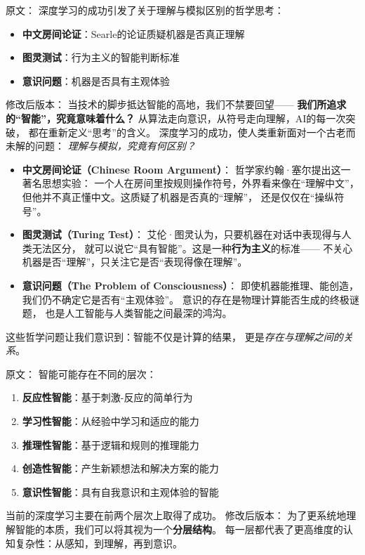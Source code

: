 原文：
深度学习的成功引发了关于理解与模拟区别的哲学思考：
\begin{itemize}
\item \textbf{中文房间论证}：Searle的论证质疑机器是否真正理解
\item \textbf{图灵测试}：行为主义的智能判断标准
\item \textbf{意识问题}：机器是否具有主观体验
\end{itemize}
修改后版本：
当技术的脚步抵达智能的高地，我们不禁要回望——  
\textbf{我们所追求的“智能”，究竟意味着什么？}  
从算法走向意识，从符号走向理解，AI的每一次突破，  
都在重新定义“思考”的含义。  
深度学习的成功，使人类重新面对一个古老而未解的问题：  
\textit{理解与模拟，究竟有何区别？}

\begin{itemize}
\item \textbf{中文房间论证（Chinese Room Argument）}：  
  哲学家约翰·塞尔提出这一著名思想实验：  
  一个人在房间里按规则操作符号，外界看来像在“理解中文”，  
  但他并不真正懂中文。这质疑了机器是否真的“理解”，  
  还是仅仅在“操纵符号”。  

\item \textbf{图灵测试（Turing Test）}：  
  艾伦·图灵认为，只要机器在对话中表现得与人类无法区分，  
  就可以说它“具有智能”。这是一种\textbf{行为主义}的标准——  
  不关心机器是否“理解”，只关注它是否“表现得像在理解”。  

\item \textbf{意识问题（The Problem of Consciousness）}：  
  即使机器能推理、能创造，我们仍不确定它是否有“主观体验”。  
  意识的存在是物理计算能否生成的终极谜题，  
  也是人工智能与人类智能之间最深的鸿沟。  
\end{itemize}
这些哲学问题让我们意识到：智能不仅是计算的结果，  
更是\textit{存在与理解之间的关系}。



原文：
智能可能存在不同的层次：
\begin{enumerate}
\item \textbf{反应性智能}：基于刺激-反应的简单行为
\item \textbf{学习性智能}：从经验中学习和适应的能力
\item \textbf{推理性智能}：基于逻辑和规则的推理能力
\item \textbf{创造性智能}：产生新颖想法和解决方案的能力
\item \textbf{意识性智能}：具有自我意识和主观体验的智能
\end{enumerate}
当前的深度学习主要在前两个层次上取得了成功。
修改后版本：
为了更系统地理解智能的本质，我们可以将其视为一个\textbf{分层结构}。  
每一层都代表了更高维度的认知复杂性：从感知，到理解，再到意识。


